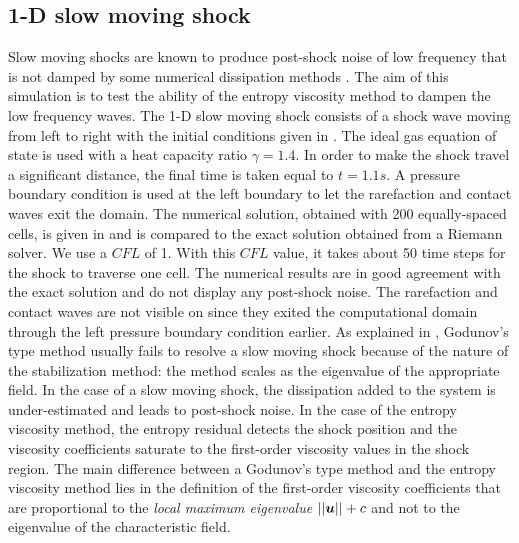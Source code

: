 \subsection{1-D slow moving shock} \label{sec:slow_moving_shock}

Slow moving shocks are known to produce post-shock noise of low frequency that is not damped by some numerical dissipation methods \cite{james}. The aim of this simulation is to test the ability of the entropy viscosity method to dampen the low frequency waves.
The 1-D slow moving shock consists of a shock wave moving from left to right with the initial conditions given in . The ideal gas equation of state is used with a heat capacity ratio $\gamma=1.4$.  In order to make the shock travel a significant distance, the final time is taken equal to $t=1.1s$. A pressure boundary condition is used at the left boundary to let the rarefaction and contact waves exit the domain.   
%
The numerical solution, obtained with 200 equally-spaced cells, is given in  and is compared to the exact solution obtained from a Riemann solver. We use a $CFL$ of 1. With this $CFL$ value, it takes about 50 time steps for the shock to traverse one cell.
%
The numerical results are in good agreement with the exact solution and do not display any post-shock noise. The rarefaction and contact waves are not visible on  since they exited the computational domain through the left pressure boundary condition earlier. As explained in \cite{roberts}, Godunov's type method usually fails to resolve a slow moving shock because of the nature of the stabilization method: the method scales as the eigenvalue of the appropriate field. In the case of a slow moving shock, the dissipation added to the system is under-estimated and leads to post-shock noise. In the case of the entropy viscosity method, the entropy residual detects the shock position and the viscosity coefficients saturate to the first-order viscosity values in the shock region. The main difference between a  Godunov's type method and the entropy viscosity method lies in the definition of the first-order viscosity coefficients that are proportional to the \emph{local maximum eigenvalue} $||\boldsymbol u||+c$ and not to the eigenvalue of the characteristic field.
%
